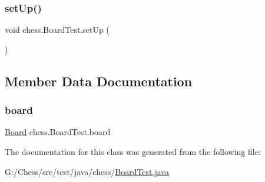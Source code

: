 \mbox{\label{classchess_1_1_board_test_acd0ea30fd3e9742c6b71a5ee60b65707}} 
\subsubsection{\texorpdfstring{set\+Up()}{setUp()}}
{\footnotesize\ttfamily void chess.\+Board\+Test.\+set\+Up (\begin{DoxyParamCaption}{ }\end{DoxyParamCaption})}



\subsection{Member Data Documentation}
\mbox{\label{classchess_1_1_board_test_a678a57765fd143e9c65eb0c6f741221c}} 
\subsubsection{\texorpdfstring{board}{board}}
{\footnotesize\ttfamily \mbox{\hyperlink{classchess_1_1models_1_1_board}{Board}} chess.\+Board\+Test.\+board\hspace{0.3cm}{\ttfamily [private]}}



The documentation for this class was generated from the following file\+:\begin{DoxyCompactItemize}
\item 
G\+:/\+Chess/src/test/java/chess/\mbox{\hyperlink{_board_test_8java}{Board\+Test.\+java}}\end{DoxyCompactItemize}
